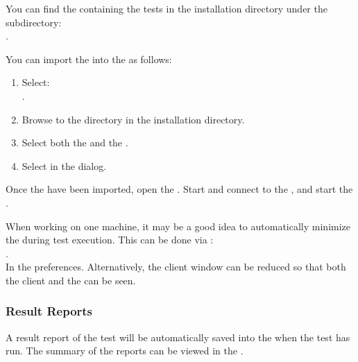 You can find the \gdproject{} containing the tests
in the installation directory under the subdirectory:\\
. 

You can import the \gdproject{} into the \ite{} as follows:
\begin{enumerate}
\item Select:\\ .
\item Browse to the  directory in the installation directory. 
\item Select both the  \gdproject{} and the  \gdproject{}. 
\item  Select  in the  dialog. 
\end{enumerate}


Once the \gdprojects have been imported, open the  \gdproject{}. Start and connect to the \gdagent {}, and start the \gdaut{} . 


When working on one machine, it may be a good idea to automatically minimize 
 the \ite{} during test execution. This can be done via :\\
. \\
In the  preferences. 
Alternatively, the client window can be reduced so 
that both the client and the \gdaut{} can be seen. 

\subsubsection{Result Reports}

A result report of the test will be automatically saved into the \gddb{} when the test has run. The summary of the reports can be viewed in the \gdtestsummaryview{} .
